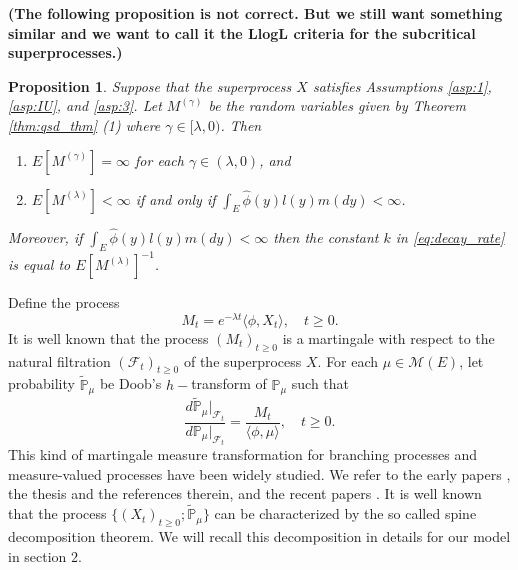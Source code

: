 \documentclass[12pt,a4paper]{amsart}
\numberwithin{equation}{section}
\theoremstyle{plain}
\newtheorem{prop}[thm]{Proposition}
\theoremstyle{definition}
\begin{document}
{\bf (The following proposition is not correct. But we still want something similar and we want to call it the LlogL criteria for the subcritical superprocesses.)}
\begin{prop}\label{eq:exp_prop}
	Suppose that the superprocess $X$ satisfies Assumptions \ref{asp:1},
  \ref{asp:IU}, and \ref{asp:3}.
	Let $M^{(\gamma)}$ be the random variables given by Theorem \ref{thm:qsd_thm} (1) where $\gamma \in [\lambda, 0)$.
  Then
  \begin{enumerate}
  \item
    $E[M^{(\gamma)}] = \infty$ for each $\gamma \in (\lambda, 0)$, and
  \item
    $E[M^{(\lambda)}] < \infty$ if and only if $\int_E \widehat\phi(y)l(y)m(dy)<\infty$.
  \end{enumerate}
  Moreover, if $\int_E \widehat\phi(y)l(y)m(dy)<\infty$ then the constant $k$ in \eqref{eq:decay_rate} is equal to $E[M^{(\lambda)}]^{-1}$.
\end{prop}
\par
Define the process
\[
	M_t=e^{-\lambda t}  \langle \phi, X_t\rangle, \quad t\geq 0.
\]
It is well known that the process  $(M_t)_{t\geq 0}$ is a martingale with respect to the natural filtration $(\mathscr F_t)_{t\geq 0}$ of the superprocess $X$.
For each $\mu \in \mathcal M(E)$, let probability $\widetilde{\mathbb P}_\mu$ be Doob's $h-$transform of $\mathbb P_\mu$ such that
\begin{equation} \label{eq:martingale_transformation}
	\frac{d\widetilde{\mathbb P}_\mu|_{\mathscr F_t}}{d\mathbb P_\mu|_{\mathscr F_t}}
	=\frac{M_t}{\langle\phi,\mu\rangle },
	\quad t\geq 0.
\end{equation}
This kind of martingale measure transformation for branching processes and measure-valued processes have been widely studied.
We refer to the early papers \cite{EnglanderKyprianou2004Local,Evans1993Two,RoellyRouault1989Processus}, the thesis \cite{Penisson2010Conditional} and the references therein, and the recent papers \cite{ChampagnatRoelly2008Limit,RenSongSun2019Spine,RenSongZhang2018Williams}.
It is well known that the process $\{(X_t)_{t\geq 0}; \widetilde{\mathbb P}_{\mu}\}$ can be characterized by the so called spine decomposition theorem.
We will recall this decomposition in details for our model in section $2$.
\end{document}
